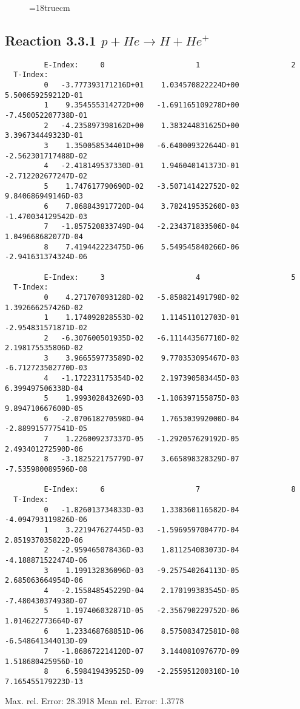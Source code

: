\begin{figure} \label{3.2.3b}
\epsfxsize=18truecm
\end{figure}
\newpage


\subsection{
Reaction 3.3.1  $  p + He \rightarrow H + He^+  $
}


\begin{verbatim}
         E-Index:     0                     1                     2
  T-Index:
         0   -3.777393171216D+01    1.034570822224D+00    5.500659259212D-01
         1    9.354555314272D+00   -1.691165109278D+00   -7.450052207738D-01
         2   -4.235897398162D+00    1.383244831625D+00    3.396734449323D-01
         3    1.350058534401D+00   -6.640009322644D-01   -2.562301717488D-02
         4   -2.418149537330D-01    1.946040141373D-01   -2.712202677247D-02
         5    1.747617790690D-02   -3.507141422752D-02    9.840686949146D-03
         6    7.868843917720D-04    3.782419535260D-03   -1.470034129542D-03
         7   -1.857520833749D-04   -2.234371833506D-04    1.049668682077D-04
         8    7.419442223475D-06    5.549545840266D-06   -2.941631374324D-06

         E-Index:     3                     4                     5
  T-Index:
         0    4.271707093128D-02   -5.858821491798D-02    1.392666257426D-02
         1    1.174092828553D-02    1.114511012703D-01   -2.954831571871D-02
         2   -6.307600501935D-02   -6.111443567710D-02    2.198175535806D-02
         3    3.966559773589D-02    9.770353095467D-03   -6.712723502770D-03
         4   -1.172231175354D-02    2.197390583445D-03    6.399497506338D-04
         5    1.999302843269D-03   -1.106397155875D-03    9.894710667600D-05
         6   -2.070618270598D-04    1.765303992000D-04   -2.889915777541D-05
         7    1.226009237337D-05   -1.292057629192D-05    2.493401272590D-06
         8   -3.182522175779D-07    3.665898328329D-07   -7.535980089596D-08

         E-Index:     6                     7                     8
  T-Index:
         0   -1.826013734833D-03    1.338360116582D-04   -4.094793119826D-06
         1    3.221947627445D-03   -1.596959700477D-04    2.851937035822D-06
         2   -2.959465078436D-03    1.811254083073D-04   -4.188871522474D-06
         3    1.199132836096D-03   -9.257540264113D-05    2.685063664954D-06
         4   -2.155848545229D-04    2.170199383545D-05   -7.480430374938D-07
         5    1.197406032871D-05   -2.356790229752D-06    1.014622773664D-07
         6    1.233468768851D-06    8.575083472581D-08   -6.548641344013D-09
         7   -1.868672214120D-07    3.144081097677D-09    1.518680425956D-10
         8    6.598419439525D-09   -2.255951200310D-10    7.165455179223D-13

\end{verbatim}
  Max. rel. Error:  28.3918 %
  Mean rel. Error:   1.3778 %

